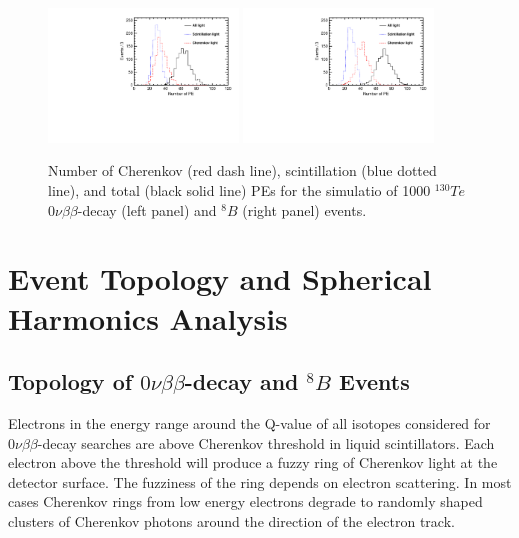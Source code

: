 \documentclass[12pt,twoside,letterpaper]{article}
\newcommand{\vbb}{0\nu\beta\beta}
\newcommand{\Te}{^{130}Te}
\newcommand{\B}{^{8}B}
\begin{document}
\begin{figure}[htb]
\centering
\includegraphics[angle=0,width=0.45\textwidth]{plots/hMomNPhot_Te130.pdf}
\includegraphics[angle=0,width=0.45\textwidth]{plots/hMomNPhot_1el_2p529MeV.pdf}
\caption{Number of Cherenkov (red dash line), scintillation (blue dotted line), and total (black solid line) PEs for the simulatio of 1000 $\Te$ $\vbb$-decay (left panel) and $\B$ (right panel) events.}
\label{fig:NPhot}
\end{figure}


\section{Event Topology and Spherical Harmonics Analysis}
\label{sec:topology_and_harmonics}

\subsection{Topology of $\vbb$-decay and $\B$ Events}
\label{subsec:topology}

Electrons in the energy range around the Q-value of all isotopes considered for $\vbb$-decay searches are above Cherenkov threshold in liquid scintillators. Each electron above the threshold will produce a fuzzy ring of Cherenkov light at the detector surface. The fuzziness of the ring depends on electron scattering. In most cases Cherenkov rings from low energy electrons degrade to randomly shaped clusters of Cherenkov photons around the direction of the electron track. 
\end{document}
